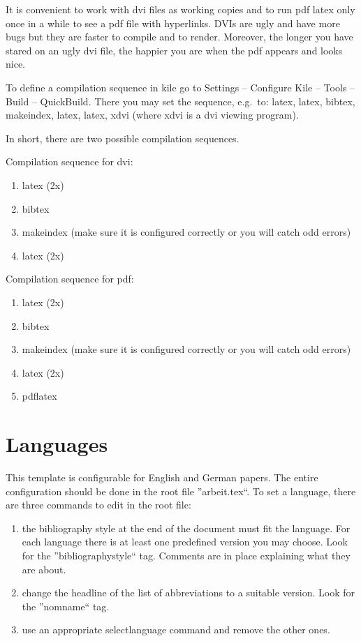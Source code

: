 It is convenient to work with dvi files as working copies and to run pdf latex only once in a while to see a pdf file with hyperlinks. DVIs are ugly and have more bugs but they are faster to compile and to render. Moreover, the longer you have stared on an ugly dvi file, the happier you are when the pdf appears and looks nice.

 To define a compilation sequence in kile go to Settings -- Configure Kile -- Tools -- Build -- QuickBuild. There you may set the sequence, e.g.\ to: latex, latex, bibtex, makeindex, latex, latex, xdvi (where xdvi is a dvi viewing program). 
 
 In short, there are two possible compilation sequences.
 
 Compilation sequence for dvi:
 \begin{enumerate}
  \item latex (2x)
  \item bibtex
  \item makeindex (make sure it is configured correctly or you will catch odd errors)
  \item latex (2x)
 \end{enumerate}
 
 Compilation sequence for pdf:
 \begin{enumerate}
  \item latex (2x)
  \item bibtex
  \item makeindex (make sure it is configured correctly or you will catch odd errors)
  \item latex (2x)
  \item pdflatex
 \end{enumerate}
  


\section{Languages}
\label{sec:languages}
This template is configurable for English and German papers. The entire configuration should be done in the root file ''arbeit.tex``. To set a language, there are three commands to edit in the root file: \begin{enumerate}
                                                                                                             \item the bibliography style at the end of the document must fit the language. For each language there is at least one predefined version you may choose. Look for the ''bibliographystyle`` tag. Comments are in place explaining what they are about.
\item change the headline of the list of abbreviations to a suitable version. Look for the ''nomname`` tag.
\item use an appropriate selectlanguage command and remove the other ones.
                                                                                                             \end{enumerate}



